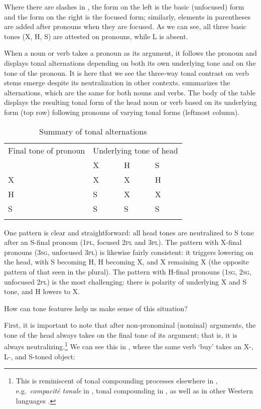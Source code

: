 \documentclass[output=paper]{langsci/langscibook}
\begin{document}
Where there are slashes in , the form on the left is the basic (unfocused) form and the form on the right is the focused form; similarly, elements in parentheses are added after pronouns when they are focused. As we can see, all three basic tones (X, H, S) are attested on pronouns, while L is absent.

When a noun or verb takes a pronoun as its argument, it follows the pronoun and displays tonal alternations depending on both its own underlying tone and on the tone of the pronoun. It is here that we see the three-way tonal contrast on verb stems emerge despite its neutralization in other contexts.  summarizes the alternations, which are the same for both nouns and verbs. The body of the table displays the resulting tonal form of the head noun or verb based on its underlying form (top row) following pronouns of varying tonal forms (leftmost column).

\begin{table}
\begin{tabularx}{\textwidth}{XXXX} 
\lsptoprule
Final tone of pronoun & \multicolumn{3}{c}{Underlying tone of head} \\\cmidrule(lr){2-4}
 & X & H & S \\ \midrule
X & X & X & H \\
H & S & X & X \\
S & S & S & S \\
\lspbottomrule
\end{tabularx}
\caption{Summary of tonal alternations}
\label{tab:mcpherson:3}
\end{table}

One pattern is clear and straightforward: all head tones are neutralized to S tone after an S-final pronoun (1\textsc{pl}, focused 2\textsc{pl} and 3\textsc{pl}). The pattern with X-final pronouns (3\textsc{sg}, unfocused 3\textsc{pl}) is likewise fairly consistent: it triggers lowering on the head, with S becoming H, H becoming X, and X remaining X (the opposite pattern of that seen in the plural). The pattern with H-final pronouns (1\textsc{sg}, 2\textsc{sg}, unfocused 2\textsc{pl}) is the most challenging: there is polarity of underlying X and S tone, and H lowers to X. 

How can tone features help us make sense of this situation?

First, it is important to note that after non-pronominal (nominal) arguments, the tone of the head always takes on the final tone of its argument; that is, it is always neutralizing.\footnote{This is reminiscent of tonal compounding processes elsewhere in , e.g.\ {\it compacit\'e tonale} in  \citep{Creissels78,Creissels88,Creissels92,Dumestre84,Green10}, tonal compounding in  \citep{Gregoire78,Greenetal13}, as well as in other Western  languages \citep{deZeeuw79}.} We can see this in , where the same verb {\it {}} `buy' takes an X-, L-, and S-toned object:
\end{document}
